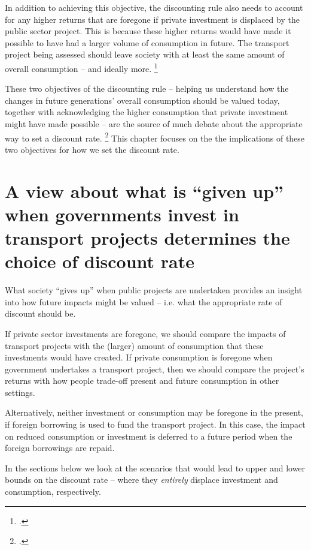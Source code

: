 In addition to achieving this objective, the discounting rule also needs to account for any higher returns that are foregone if private investment is displaced by the public sector project. This is because these higher returns would have made it possible to have had a larger volume of consumption in future. The transport project being assessed should leave society with at least the same amount of overall consumption -- and ideally more.%
    \footcite[][10]{Harberger-and-Jenkins-2015-musings-on-the-discount-rate} 

These two objectives of the discounting rule -- helping us understand how the changes in future generations' overall consumption should be valued today, together with acknowledging the higher consumption that private investment might have made possible -- are the source of much debate about the appropriate way to set a discount rate.%
    \footcite[][46]{Parker-2009-NZTA-discount-rates}
This chapter focuses on the the implications of these two objectives for how we set the discount rate. 


\section{A view about what is ``given up'' when governments invest in transport projects determines the choice of discount rate}

What society ``gives up'' when public projects are undertaken provides an insight into how future impacts might be valued -- i.e. what the appropriate rate of discount should be. 

If private sector investments are foregone, we should compare the impacts of transport projects with the (larger) amount of consumption that these investments would have created. If private consumption is foregone when government undertakes a transport project, then we should compare the project's returns with how people trade-off present and future consumption in other settings. 

Alternatively, neither investment or consumption may be foregone in the present, if foreign borrowing is used to fund the transport project. In this case, the impact on reduced consumption or investment is deferred to a future period when the foreign borrowings are repaid.

In the sections below we look at the scenarios that would lead to upper and lower bounds on the discount rate -- where they \emph{entirely} displace investment and consumption, respectively. 


